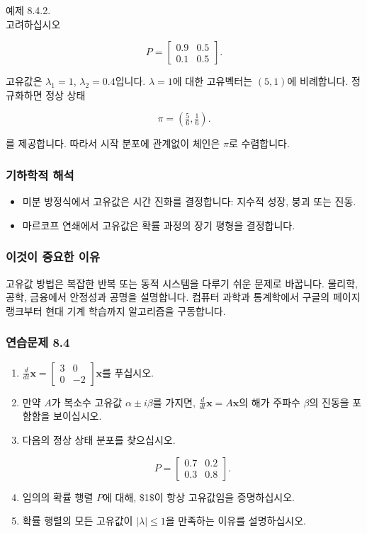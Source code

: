 \documentclass[
  12pt,
  a4paper,
]{article}
\begin{document}
예제 8.4.2.\\
고려하십시오

\[P = \begin{bmatrix}
0.9 & 0.5 \\
0.1 & 0.5 \end{bmatrix}.\]

고유값은 \(\lambda_1 = 1\), \(\lambda_2 = 0.4\)입니다. \(\lambda = 1\)에 대한 고유벡터는 \((5,1)\)에 비례합니다. 정규화하면 정상 상태

\[\pi = \left(\tfrac{5}{6}, \tfrac{1}{6}\right).\]

를 제공합니다. 따라서 시작 분포에 관계없이 체인은 \(\pi\)로 수렴합니다.

\subsubsection{기하학적 해석}\label{geometric-interpretation-19}

\begin{itemize}
\item
  미분 방정식에서 고유값은 시간 진화를 결정합니다: 지수적 성장, 붕괴 또는 진동.
\item
  마르코프 연쇄에서 고유값은 확률 과정의 장기 평형을 결정합니다.
\end{itemize}

\subsubsection{이것이 중요한 이유}\label{why-this-matters-31}

고유값 방법은 복잡한 반복 또는 동적 시스템을 다루기 쉬운 문제로 바꿉니다. 물리학, 공학, 금융에서 안정성과 공명을 설명합니다. 컴퓨터 과학과 통계학에서 구글의 페이지랭크부터 현대 기계 학습까지 알고리즘을 구동합니다.

\subsubsection{연습문제 8.4}\label{exercises-84}

\begin{enumerate}
\def\labelenumi{\arabic{enumi}.}
\item
  \(\tfrac{d}{dt}\mathbf{x} = \begin{bmatrix} 3 & 0 \\ 0 & -2 \end{bmatrix}\mathbf{x}\)를 푸십시오.
\item
  만약 \(A\)가 복소수 고유값 \(\alpha \pm i\beta\)를 가지면, \(\tfrac{d}{dt}\mathbf{x} = A\mathbf{x}\)의 해가 주파수 \(\beta\)의 진동을 포함함을 보이십시오.
\item
  다음의 정상 상태 분포를 찾으십시오.

  \[P = \begin{bmatrix} 0.7 & 0.2 \\ 0.3 & 0.8 \end{bmatrix}.\]
\item
  임의의 확률 행렬 \(P\)에 대해, \$1\$이 항상 고유값임을 증명하십시오.
\item
  확률 행렬의 모든 고유값이 \(|\lambda| \leq 1\)을 만족하는 이유를 설명하십시오.
\end{enumerate}
\end{document}
